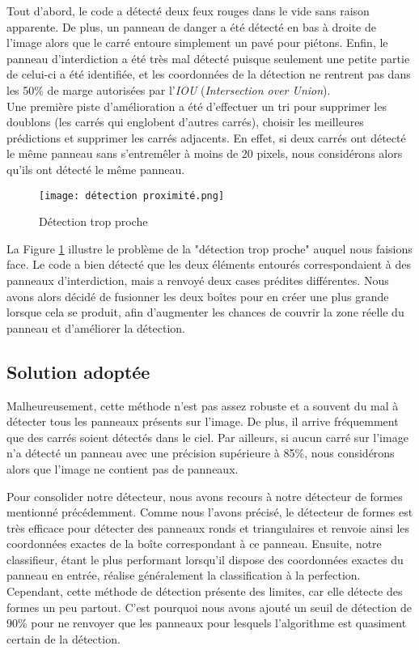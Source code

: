 \documentclass[twocolumn,10pt]{article}
\begin{document}
    Tout d'abord, le code a détecté deux feux rouges dans le vide sans raison apparente. De plus, un panneau de danger a été détecté en bas à droite de l'image alors que le carré entoure simplement un pavé pour piétons. Enfin, le panneau d'interdiction a été très mal détecté puisque seulement une petite partie de celui-ci a été identifiée, et les coordonnées de la détection ne rentrent pas dans les 50\% de marge autorisées par l'\textit{IOU} (\textit{Intersection over Union}).\\


    Une première piste d'amélioration a été d'effectuer un tri pour supprimer les doublons (les carrés qui englobent d'autres carrés), choisir les meilleures prédictions et supprimer les carrés adjacents. En effet, si deux carrés ont détecté le même panneau sans s'entremêler à moins de 20 pixels, nous considérons alors qu'ils ont détecté le même panneau.

    \begin{figure}
        \centering
        \texttt{[image: détection proximité.png]}
        \caption{Détection trop proche}
        \label{fig:detection-proximite}
    \end{figure}

    La Figure \ref{fig:detection-proximite} illustre le problème de la "détection trop proche" auquel nous faisions face. Le code a bien détecté que les deux éléments entourés correspondaient à des panneaux d'interdiction, mais a renvoyé deux cases prédites différentes. Nous avons alors décidé de fusionner les deux boîtes pour en créer une plus grande lorsque cela se produit, afin d'augmenter les chances de couvrir la zone réelle du panneau et d'améliorer la détection.


    \subsection{Solution adoptée}

    Malheureusement, cette méthode n'est pas assez robuste et a souvent du mal à détecter tous les panneaux présents sur l'image. De plus, il arrive fréquemment que des carrés soient détectés dans le ciel. Par ailleurs, si aucun carré sur l'image n'a détecté un panneau avec une précision supérieure à 85\%, nous considérons alors que l'image ne contient pas de panneaux.


    Pour consolider notre détecteur, nous avons recours à notre détecteur de formes mentionné précédemment. Comme nous l'avons précisé, le détecteur de formes est très efficace pour détecter des panneaux ronds et triangulaires et renvoie ainsi les coordonnées exactes de la boîte correspondant à ce panneau. Ensuite, notre classifieur, étant le plus performant lorsqu'il dispose des coordonnées exactes du panneau en entrée, réalise généralement la classification à la perfection. Cependant, cette méthode de détection présente des limites, car elle détecte des formes un peu partout. C'est pourquoi nous avons ajouté un seuil de détection de 90\% pour ne renvoyer que les panneaux pour lesquels l'algorithme est quasiment certain de la détection.
\end{document}
